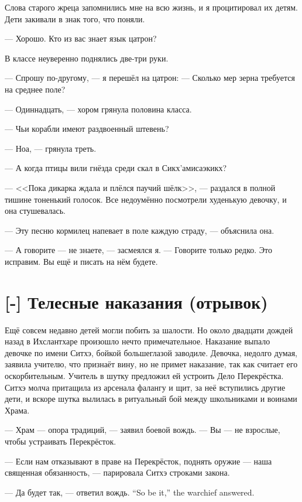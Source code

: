Слова старого жреца запомнились мне на всю жизнь, и я процитировал их детям.
Дети закивали в знак того, что поняли.

--- Хорошо.
Кто из вас знает язык цатрон?

В классе неуверенно поднялись две-три руки.

--- Спрошу по-другому, --- я перешёл на цатрон:
--- Сколько мер зерна требуется на среднее поле?

--- Одиннадцать, --- хором грянула половина класса.

--- Чьи корабли имеют раздвоенный штевень?

--- Ноа, --- грянула треть.

--- А когда птицы вили гнёзда среди скал в Сикх'амисаэкикх?

--- <<Пока дикарка ждала и плёлся паучий шёлк>>, --- раздался в полной тишине тоненький голосок.
Все недоумённо посмотрели худенькую девочку, и она стушевалась.

--- Эту песню кормилец напевает в поле каждую страду, --- объяснила она.

--- А говорите --- не знаете, --- засмеялся я.
--- Говорите только редко.
Это исправим.
Вы ещё и писать на нём будете.


\section{[-] Телесные наказания (отрывок)}

\textspace

Ещё совсем недавно детей могли побить за шалости.
Но около двадцати дождей назад в Ихслантхаре произошло нечто примечательное.
Наказание выпало девочке по имени Ситхэ, бойкой большеглазой заводиле.
Девочка, недолго думая, заявила учителю, что признаёт вину, но не примет наказание, так как считает его оскорбительным.
Учитель в шутку предложил ей устроить Дело Перекрёстка.
Ситхэ молча притащила из арсенала фалангу и щит, за неё вступились другие дети, и вскоре шутка вылилась в ритуальный бой между школьниками и воинами Храма.

--- Храм --- опора традиций, --- заявил боевой вождь.
--- Вы --- не взрослые, чтобы устраивать Перекрёсток.

--- Если нам отказывают в праве на Перекрёсток, поднять оружие --- наша священная обязанность, --- парировала Ситхэ строками закона.

{--- Да будет так, --- ответил вождь.}
{``So be it,'' the warchief answered.}

